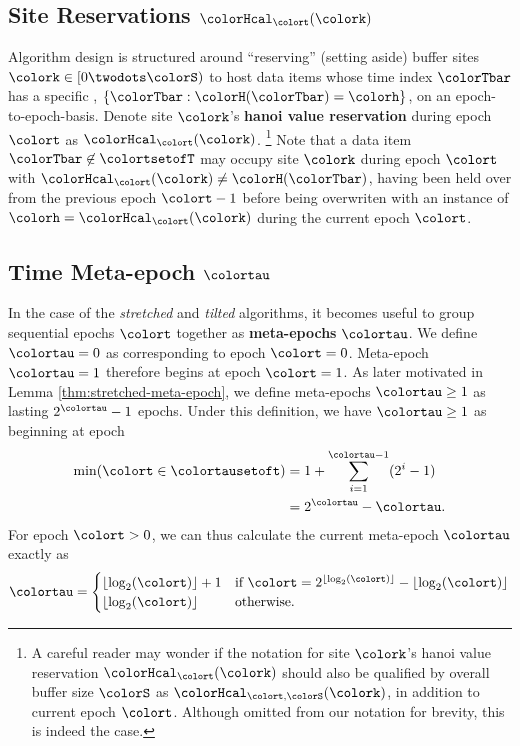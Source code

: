 \subsection{Site Reservations $\colorHcal_{\colort}(\colork)$}
\label{sec:notation-reservation}

Algorithm design is structured around ``reserving'' (setting aside) buffer sites $\colork \in [0 \twodots \colorS)$ to host data items whose time index $\colorTbar$ has a specific \hv{}, $\{\colorTbar : \colorH(\colorTbar) = \colorh \}$, on an epoch-to-epoch-basis.
Denote site $\colork$'s \textbf{hanoi value reservation} during epoch $\colort$ as $\colorHcal_{\colort}(\colork)$.%
\footnote{
A careful reader may wonder if the notation for site $\colork$'s hanoi value reservation $\colorHcal_{\colort}(\colork)$ should also be qualified by overall buffer size $\colorS$ as $\colorHcal_{\colort,\colorS}(\colork)$, in addition to current epoch $\colort$.
Although omitted from our notation for brevity, this is indeed the case.
}
Note that a data item $\colorTbar \not\in \colortsetofT$ may occupy site $\colork$ during epoch $\colort$ with $\colorHcal_{\colort}(\colork) \neq \colorH(\colorTbar)$, having been held over from the previous epoch $\colort - 1$ before being overwriten with an instance of \hv{} $\colorh = \colorHcal_{\colort}(\colork)$ during the current epoch $\colort$.

\subsection{Time Meta-epoch $\colortau$}
\label{sec:notation-metaepoch}

In the case of the \textit{stretched} and \textit{tilted} algorithms, it becomes useful to group sequential epochs $\colort$ together as \textbf{meta-epochs} $\colortau$.
We define $\colortau=0$ as corresponding to epoch $\colort=0$.
Meta-epoch $\colortau=1$ therefore begins at epoch $\colort = 1$.
As later motivated in Lemma \ref{thm:stretched-meta-epoch}, we define meta-epochs $\colortau\geq1$ as lasting $2^{\colortau} - 1$ epochs.
Under this definition, we have $\colortau\geq1$ as beginning at epoch
\begin{align}
\min(\colort \in \colortausetoft)
&= 1 + \sum_{i=1}^{\colortau - 1} (2^{i} - 1) \nonumber \\
&= 2^{\colortau} - \colortau.
\label{eqn:meta-epoch-defn}
\end{align}
For epoch $\colort > 0$, we can thus calculate the current meta-epoch $\colortau$ exactly as
\begin{align*}
\colortau
=
\begin{cases}
\left\lfloor \log_2(\colort) \right\rfloor + 1 & \text{if } \colort = 2^{\left\lfloor \log_2(\colort) \right\rfloor} - \left\lfloor \log_2(\colort) \right\rfloor \\
\left\lfloor \log_2(\colort) \right\rfloor & \text{otherwise.}
\end{cases}
\end{align*}

